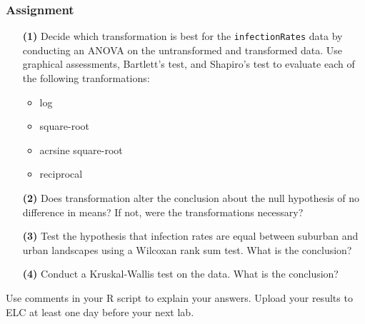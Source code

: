 \documentclass[color=usenames,dvipsnames]{beamer}\usepackage[]{graphicx}\usepackage[]{color}
\newcommand{\inr}[1]{\colorbox{inlinecolor}{\texttt{#1}}}
\begin{document}




\begin{frame}
  \frametitle{Assignment}
  \footnotesize
  \begin{enumerate}
    \item[\bf (1)] Decide which transformation is best for the
      \inr{infectionRates} data by conducting an ANOVA on the
      untransformed and transformed data. Use graphical assessments,
      Bartlett's test, and Shapiro's test to evaluate each of the
      following tranformations:
      \begin{itemize}
        \item log
        \item square-root
        \item acrsine square-root
        \item reciprocal
      \end{itemize}
    \item[\bf (2)] Does transformation alter the conclusion about the
      null hypothesis of no difference in means? If not, were the
      transformations necessary?
    \item[\bf (3)] Test the hypothesis that infection rates are equal
      between suburban and urban landscapes using a Wilcoxan rank sum
      test. What is the conclusion?
    \item[\bf (4)] Conduct a Kruskal-Wallis test on the data. What
      is the conclusion? %
  \end{enumerate}
  \vfill
  Use comments in your R script to explain your answers. Upload your
  results to ELC at least one day before your next lab.\\
\end{frame}
\end{document}
